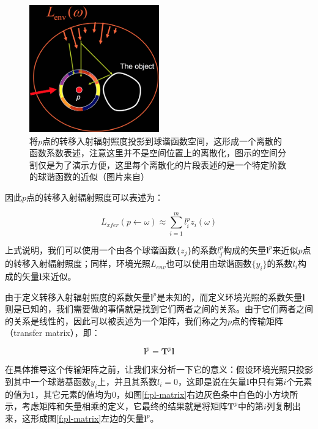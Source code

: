 \begin{figure}
\sidecaption
	\includegraphics[width=0.5\textwidth]{figures/prt/prt-10}
	\caption{将$p$点的转移入射辐射照度投影到球谐函数空间，这形成一个离散的函数系数表述，注意这里并不是空间位置上的离散化，图示的空间分割仅是为了演示方便，这里每个离散化的片段表述的是一个特定阶数的球谐函数的近似（图片来自\cite{a:PrecomputedRadianceTransfer:TheoryandPractice}）}
	\label{f:pl-tir-projection}
\end{figure}

因此$p$点的转移入射辐射照度可以表述为：

\begin{equation}
	L_{xfer}(p\leftarrow\omega)\approx\sum^{m}_{i=1}l^{p}_{i}z_i(\omega)
\end{equation}

上式说明，我们可以使用一个由各个球谐函数$\{z_j\}$的系数$l^{p}_j$构成的矢量$\mathbf{l}^{p}$来近似$p$点的转移入射辐射照度；同样，环境光照$L_{env}$也可以使用由球谐函数$\{y_i\}$的系数$l_i$构成的矢量$\mathbf{l}$来近似。

由于定义转移入射辐射照度的系数矢量$\mathbf{l}^{p}$是未知的，而定义环境光照的系数矢量$\mathbf{l}$则是已知的，我们需要做的事情就是找到它们两者之间的关系。由于它们两者之间的关系是线性的，因此可以被表述为一个矩阵，我们称之为$p$点的传输矩阵（transfer matrix），即：

\begin{equation}
	\mathbf{l}^{p}=\mathbf{T}^{p}\mathbf{l}
\end{equation}

在具体推导这个传输矩阵之前，让我们来分析一下它的意义：假设环境光照只投影到其中一个球谐基函数$y_i$上，并且其系数$l_i=0$，这即是说在矢量$\mathbf{l}$中只有第$i$个元素的值为1，其它元素的值均为0，如图\ref{f:pl-matrix}右边灰色条中白色的小方块所示，考虑矩阵和矢量相乘的定义，它最终的结果就是将矩阵$\mathbf{T}^{p}$中的第$i$列复制出来，这形成图\ref{f:pl-matrix}左边的矢量$\mathbf{l}^{p}$。

